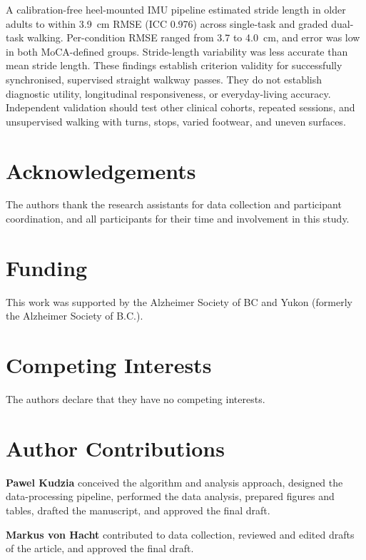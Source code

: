 \documentclass[fleqn,10pt,lineno]{wlpeerj}
\begin{document}
A calibration-free heel-mounted IMU pipeline estimated stride length in older adults to within 3.9~cm RMSE (ICC 0.976) across single-task and graded dual-task walking. Per-condition RMSE ranged from 3.7 to 4.0~cm, and error was low in both MoCA-defined groups. Stride-length variability was less accurate than mean stride length. These findings establish criterion validity for successfully synchronised, supervised straight walkway passes. They do not establish diagnostic utility, longitudinal responsiveness, or everyday-living accuracy. Independent validation should test other clinical cohorts, repeated sessions, and unsupervised walking with turns, stops, varied footwear, and uneven surfaces.

\clearpage
\section*{Acknowledgements}

The authors thank the research assistants for data collection and participant coordination, and all participants for their time and involvement in this study.

\section*{Funding}

This work was supported by the Alzheimer Society of BC and Yukon (formerly the Alzheimer Society of B.C.).

\section*{Competing Interests}

The authors declare that they have no competing interests.

\section*{Author Contributions}

\textbf{Pawel Kudzia} conceived the algorithm and analysis approach, designed the data-processing pipeline, performed the data analysis, prepared figures and tables, drafted the manuscript, and approved the final draft.

\textbf{Markus von Hacht} contributed to data collection, reviewed and edited drafts of the article, and approved the final draft.
\end{document}
